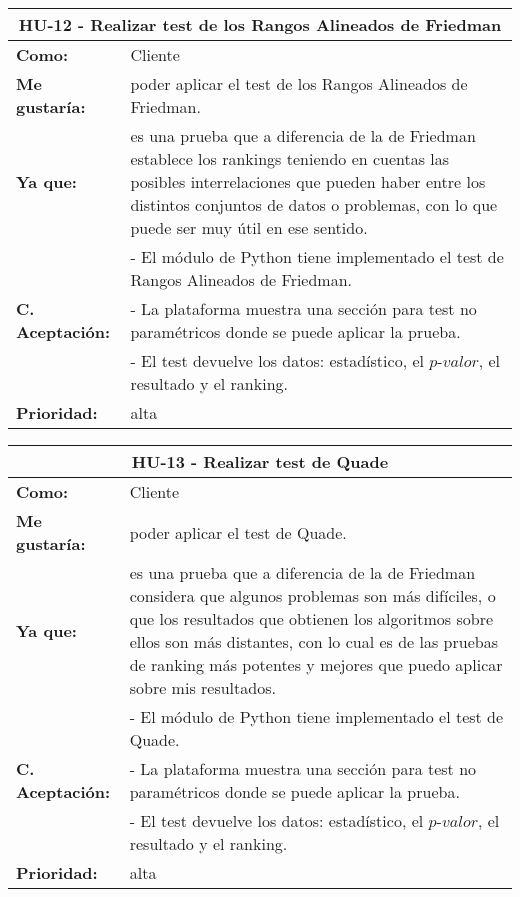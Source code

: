 
\begin{table}[H]
	\begin{tabular}{| p{3cm}| p{11cm} |}
		\hline
		\multicolumn{2}{|c|}{\textbf{HU-12} - Realizar test de los Rangos Alineados de Friedman} \\ \hline
		\textbf{Como:} & Cliente \\ \hline
		\textbf{Me gustaría:} & poder aplicar el test de los Rangos Alineados de Friedman. \\ \hline
		\textbf{Ya que:} & es una prueba que a diferencia de la de Friedman establece los rankings teniendo en cuentas las posibles interrelaciones que pueden haber entre los distintos conjuntos de datos o problemas, con lo que puede ser muy útil en ese sentido. \\ \hline
		\multirow{3}{11cm}{\textbf{C. Aceptación:}} & - El módulo de Python tiene implementado el test de Rangos Alineados de Friedman. \\
		& - La plataforma muestra una sección para test no paramétricos donde se puede aplicar la prueba. \\
		& - El test devuelve los datos: estadístico, el $\textit{p-valor}$, el resultado y el ranking. \\ \hline
		\textbf{\textbf{Prioridad:}} & alta \\ \hline
	\end{tabular}
\end{table}


\begin{table}[H]
	\begin{tabular}{| p{3cm}| p{11cm} |}
		\hline
		\multicolumn{2}{|c|}{\textbf{HU-13} - Realizar test de Quade} \\ \hline
		\textbf{Como:} & Cliente \\ \hline
		\textbf{Me gustaría:} & poder aplicar el test de Quade. \\ \hline
		\textbf{Ya que:} & es una prueba que a diferencia de la de Friedman considera que algunos problemas son más difíciles, o que los resultados que obtienen los algoritmos sobre ellos son más distantes, con lo cual es de las pruebas de ranking más potentes y mejores que puedo aplicar sobre mis resultados. \\ \hline
		\multirow{3}{11cm}{\textbf{C. Aceptación:}} & - El módulo de Python tiene implementado el test de Quade. \\
		& - La plataforma muestra una sección para test no paramétricos donde se puede aplicar la prueba. \\
		& - El test devuelve los datos: estadístico, el $\textit{p-valor}$, el resultado y el ranking. \\ \hline
		\textbf{\textbf{Prioridad:}} & alta \\ \hline
	\end{tabular}
\end{table}


